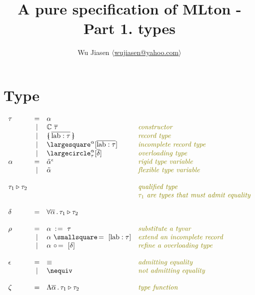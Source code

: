 \documentclass[11pt,a4paper]{article}
\newcommand{\nbkey}[1]{\textrm{#1}}
\newcommand{\record}[1]{\{\!\!\shortmid #1 \shortmid\!\!\}}
\newcommand{\overld}[3]{\largecircle^{#1}_{#2}{#3}}
\newcommand{\irecrd}[2]{\largesquare^{#1}{#2}}
\newcommand{\tyvarsubst}[2]{#1\ \hspace{-0.2ex}:\hspace{1pt}=\ #2}
\newcommand{\ovldrefine}[2]{#1\ \circ\hspace{-0.3ex}=\ #2}
\newcommand{\irecextend}[2]{#1\ \smallsquare\hspace{-0.3ex}=\ #2}
\newcommand{\lab}{\nbkey{lab}}
\newcommand{\rigdvar}[1]{\ddot{#1}}
\newcommand{\flexvar}[1]{\tilde#1}
\newcommand{\comment}[1]{\textit{\color{olive}#1}}
\newcommand{\tycon}{\mathbb{C}}
\newcommand{\tyfun}{\zeta}
\newcommand{\type}{\tau}
\newcommand{\qualtype}[2]{#1 \triangleright #2}
\newcommand{\scheme}{\delta}
\newcommand{\substitute}{\rho}
\newcommand{\equality}{\epsilon}
\newcommand{\eqyes}{\equiv}
\newcommand{\eqnot}{\nequiv}
\begin{document}
\title {A pure specification of MLton - Part 1. types}
\author{Wu Jiasen $\langle$\href{mailto:wujiasen@yahoo.com}{wujiasen@yahoo.com}$\rangle$}
\maketitle 

\section{Type}
{\renewcommand{\arraystretch}{1.2}\[
\begin{array}{lcll}
\type
     & = & \alpha                                           & \\
     & | & \tycon\ \overline\type              	            &\comment{constructor}\\
     & | & \record{\overline{\lab:\type}}       		    &\comment{record type}\\
     & | & \irecrd{\alpha}{[\overline{\lab:\type}]}         &\comment{incomplete record type}\\
     & | & \overld{\alpha}{\type}{[\overline\scheme]}     	&\comment{overloading type}\\
\alpha 
     & = & \rigdvar{\alpha}^{\equality}                     &\comment{rigid type variable}\\
     & | & \flexvar{\alpha}                                 &\comment{flexible type variable}\\     
\\
\qualtype{\type_1}{\type_2} & &                             &\comment{qualified type} \\
                            & &                             &\comment{$\type_1$ are types that must admit equality} \\
\\     
\scheme 
     & = & \forall \overline{\alpha}\,.\,\qualtype{\type_1}{\type_2}
                                                            &\\
\\
\substitute
     & = & \tyvarsubst{\alpha}{\type}                   	&\comment{substitute a tyvar}\\
     & | & \irecextend{\alpha}{[\lab:\type]}	     	    &\comment{extend an incomplete record}\\
     & | & \ovldrefine{\alpha}{[\scheme]}               	&\comment{refine a overloading type}\\
\\     
\equality
	& = & \eqyes	& \comment{admitting equality}     \\
	& | & \eqnot	& \comment{not admitting equality} \\
\\
\tyfun
     & = & \Lambda{\overline{\alpha}}\,.\,{\qualtype{\type_1}{\type_2}} 
                                                            &\comment{type function}\\
\end{array}
\]}
\end{document}
